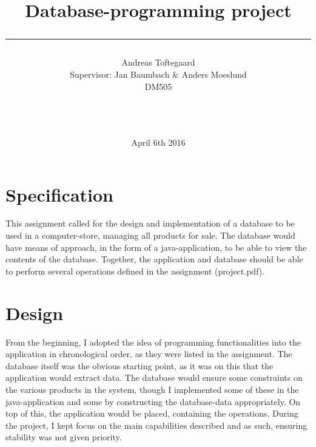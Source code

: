 \documentclass[a4paper,10pt]{article}
\title{Database-programming project
\\\rule{10cm}{0.5mm}}
\author{Andreas Toftegaard
\\Supervisor: Jan Baumbach \& Anders Moeslund\\ DM505\\\rule{5.5cm}{0.5mm}\\}
\date{April 6th 2016}
\begin{document}
\maketitle

\vfill

\tableofcontents

\newpage
\section{Specification} 
This assignment called for the design and implementation of a database to be used in a computer-store, managing all products for sale. The database would have means of approach, in the form of a java-application, to be able to view the contents of the database. Together, the application and database should be able to perform several operations defined in the assignment (project.pdf). 
\section{Design}
From the beginning, I adopted the idea of programming functionalities into the application in chronological order, as they were listed in the assignment. The database itself was the obvious starting point, as it was on this that the application would extract data. The database would ensure some constraints on the various products in the system, though I implemented some of these in the java-application and some by constructing the database-data appropriately. On top of this, the application would be placed, containing the operations. During the project, I kept focus on the main capabilities described and as such, ensuring stability was not given priority. 
\end{document}
